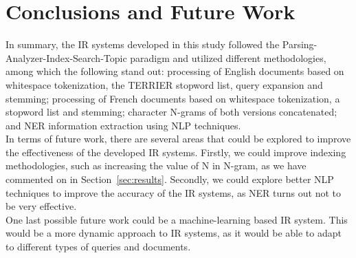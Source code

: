 \section{Conclusions and Future Work}
\label{sec:conclusion}

In summary, the IR systems developed in this study followed the Parsing-Analyzer-Index-Search-Topic paradigm and utilized different methodologies, among which the following stand out: processing of English documents based on whitespace tokenization, the TERRIER stopword list, query expansion and stemming; processing of French documents based on whitespace tokenization, a stopword list and stemming; character N-grams of both versions concatenated; and NER information extraction using NLP techniques.\\

In terms of future work, there are several areas that could be explored to improve the effectiveness of the developed IR systems. Firstly, we could improve indexing methodologies, such as increasing the value of N in N-gram, as we have commented on in Section~\ref{sec:results}. Secondly, we could explore better NLP techniques to improve the accuracy of the IR systems, as NER turns out not to be very effective.\\

One last possible future work could be a machine-learning based IR system. This would be a more dynamic approach to IR systems, as it would be able to adapt to different types of queries and documents.